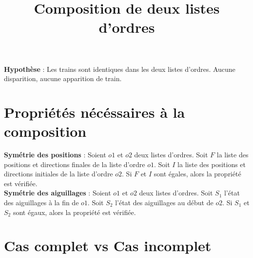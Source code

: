 \documentclass[12pt]{article}
\title{Composition de deux listes d'ordres}
\author{}
\begin{document}
\maketitle

\textbf{Hypothèse} : Les trains sont identiques dans les deux listes d'ordres.
Aucune disparition, aucune apparition de train.

\section{Propriétés nécéssaires à la composition}

\textbf{Symétrie des positions} : 
Soient $o1$ et $o2$ deux listes d'ordres.
Soit $F$ la liste des positions et directions finales de la liste d'ordre $o1$.
Soit $I$ la liste des positions et directions initiales de la liste d'ordre $o2$.
Si $F$ et $I$ sont égales, alors la propriété est vérifiée.
\vspace{0.5cm}\\
\textbf{Symétrie des aiguillages} : 
Soient $o1$ et $o2$ deux listes d'ordres.
Soit $S_1$ l'état des aiguillages à la fin de $o1$. 
Soit $S_2$ l'état des aiguillages au début de $o2$.
Si $S_1$ et $S_2$ sont égaux, alors la propriété est vérifiée.

\section{Cas complet vs Cas incomplet}
\end{document}
